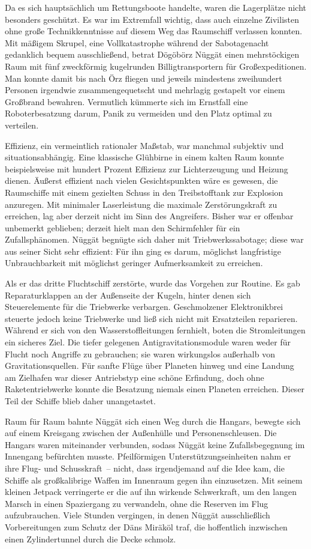 Da es sich hauptsächlich um Rettungsboote handelte, waren die Lagerplätze nicht besonders geschützt. Es war im Extremfall wichtig, dass auch einzelne Zivilisten ohne große Technikkenntnisse auf diesem Weg das Raumschiff verlassen konnten. Mit mäßigem Skrupel, eine Vollkatastrophe während der Sabotagenacht gedanklich bequem ausschließend, betrat Dögöbörz Nüggät einen mehrstöckigen Raum mit fünf zweckförmig kugelrunden Billigtransportern für Großexpeditionen. Man konnte damit bis nach Örz fliegen und jeweils mindestens zweihundert Personen irgendwie zusammengequetscht und mehrlagig gestapelt vor einem Großbrand bewahren. Vermutlich kümmerte sich im Ernstfall eine Roboterbesatzung darum, Panik zu vermeiden und den Platz optimal zu verteilen.

Effizienz, ein vermeintlich rationaler Maßstab, war manchmal subjektiv und situationsabhängig. Eine klassische Glühbirne in einem kalten Raum konnte beispielsweise mit hundert Prozent Effizienz zur Lichterzeugung und Heizung dienen. Äußerst effizient nach vielen Gesichtspunkten wäre es gewesen, die Raumschiffe mit einem gezielten Schuss in den Treibstofftank zur Explosion anzuregen. Mit minimaler Laserleistung die maximale Zerstörungskraft zu erreichen, lag aber derzeit nicht im Sinn des Angreifers. Bisher war er offenbar unbemerkt geblieben; derzeit hielt man den Schirmfehler für ein Zufallsphänomen. Nüggät begnügte sich daher mit Triebwerkssabotage; diese war aus seiner Sicht sehr effizient: Für ihn ging es darum, möglichst langfristige Unbrauchbarkeit mit möglichst geringer Aufmerksamkeit zu erreichen.

Als er das dritte Fluchtschiff zerstörte, wurde das Vorgehen zur Routine. Es gab Reparaturklappen an der Außenseite der Kugeln, hinter denen sich Steuerelemente für die Triebwerke verbargen. Geschmolzener Elektronikbrei steuerte jedoch keine Triebwerke und ließ sich nicht mit Ersatzteilen reparieren. Während er sich von den Wasserstoffleitungen fernhielt, boten die Stromleitungen ein sicheres Ziel. Die tiefer gelegenen Antigravitationsmodule waren weder für Flucht noch Angriffe zu gebrauchen; sie waren wirkungslos außerhalb von Gravitationsquellen. Für sanfte Flüge über Planeten hinweg und eine Landung am Zielhafen war dieser Antriebstyp eine schöne Erfindung, doch ohne Raketentriebwerke konnte die Besatzung niemals einen Planeten erreichen. Dieser Teil der Schiffe blieb daher unangetastet.

Raum für Raum bahnte Nüggät sich einen Weg durch die Hangars, bewegte sich auf einem Kreisgang zwischen der Außenhülle und Personenschleusen. Die Hangars waren miteinander verbunden, sodass Nüggät keine Zufallsbegegnung im Innengang befürchten musste. Pfeilförmigen Unterstützungseinheiten nahm er ihre Flug- und Schusskraft~– nicht, dass irgendjemand auf die Idee kam, die Schiffe als großkalibrige Waffen im Innenraum gegen ihn einzusetzen. Mit seinem kleinen Jetpack verringerte er die auf ihn wirkende Schwerkraft, um den langen Marsch in einen Spaziergang zu verwandeln, ohne die Reserven im Flug aufzubrauchen. Viele Stunden vergingen, in denen Nüggät ausschließlich Vorbereitungen zum Schutz der Däns Miräköl traf, die hoffentlich inzwischen einen Zylindertunnel durch die Decke schmolz.

